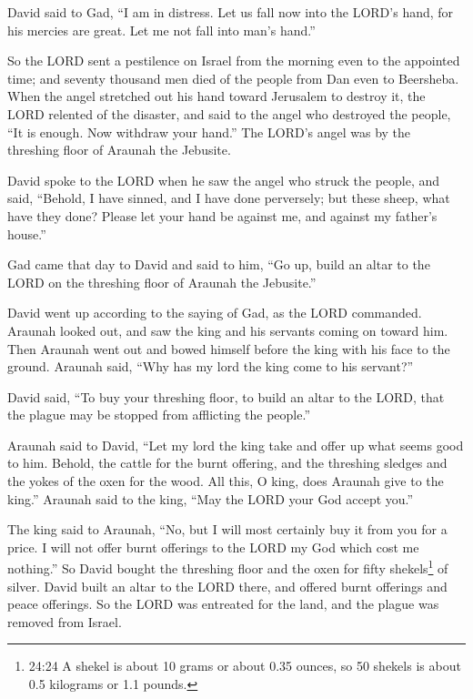 \myverse{}David said to Gad, “I am in distress. Let us fall now into the
LORD’s hand, for his mercies are great. Let me not fall into man’s hand.”

\myverse{}So the LORD sent a pestilence on Israel from the morning even
to the appointed time; and seventy thousand men died of the people from Dan even to Beersheba.
\myverse{}When the angel stretched out his hand toward Jerusalem to destroy it, the
LORD relented of the disaster, and said to the angel who destroyed the people, “It is enough. Now withdraw
your hand.” The LORD’s angel was by the threshing floor of Araunah the Jebusite.

\myverse{}David spoke to the LORD when he saw the angel who struck the
people, and said, “Behold, I have sinned, and I have done perversely; but these sheep, what have they
done? Please let your hand be against me, and against my father’s house.”

\myverse{}Gad came that day to David and said to him, “Go up, build an
altar to the LORD on the threshing floor of Araunah the Jebusite.”

\myverse{}David went up according to the saying of Gad, as the LORD commanded.
\myverse{}Araunah looked out, and saw the king and his servants coming on toward him.
Then Araunah went out and bowed himself before the king with his face to the ground.
\myverse{}Araunah said, “Why has my lord the king come to his servant?”

David said, “To buy your threshing floor, to build an altar to the LORD, that the plague
may be stopped from afflicting the people.”

\myverse{}Araunah said to David, “Let my lord the king take and offer
up what seems good to him. Behold, the cattle for the burnt offering, and the threshing sledges and the
yokes of the oxen for the wood.
\myverse{}All this, O king, does Araunah give to the king.” Araunah said to the king,
“May the LORD your God accept you.”

\myverse{}The king said to Araunah, “No, but I will most certainly buy
it from you for a price. I will not offer burnt offerings to the LORD my God which cost me nothing.” So
David bought the threshing floor and the oxen for fifty shekels\footnote{24:24 A shekel is about 10 grams or about 0.35 ounces, so 50 shekels is about 0.5 kilograms or 1.1
	pounds.} of silver.
\myverse{}David built an altar to the LORD there, and offered burnt offerings and peace
offerings. So the LORD was entreated for the land, and the plague was removed from Israel.